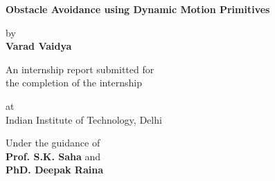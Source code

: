 \begin{titlepage}
    \begin{center}
        \vspace*{1cm}
        
        \Huge
        \textbf{Obstacle Avoidance using Dynamic Motion Primitives}
        
        \vspace{0.5cm}
        \LARGE

        by\\
    
        \textbf{Varad Vaidya}
        
        \vfill
        
        An internship report submitted for \\
        the completion of the internship
    
        
        \vspace{1.8cm}

        
        \Large
        at \\Indian Institute of Technology, Delhi\\
        \vspace{1.0cm}
        \begin{flushleft}
        \large
        Under the guidance of \\
        \textbf{Prof. S.K. Saha}
        and \\
        \textbf{PhD. Deepak Raina}
        \end{flushleft}
        
    \end{center}
    
\end{titlepage}